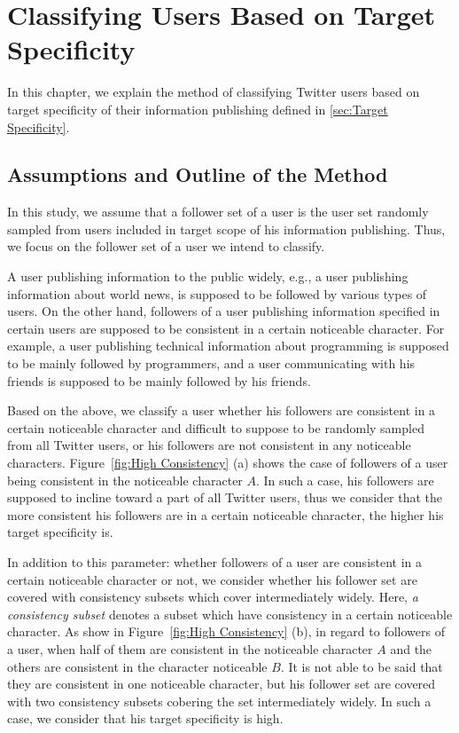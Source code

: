 \section{Classifying Users Based on Target Specificity}
\label{sec:ClassificationMethod1}

In this chapter, we explain the method of classifying Twitter users
based on target specificity of their information publishing defined
in \ref{sec:Target Specificity}.

\subsection{Assumptions and Outline of the Method}
\label{subsec:Assumptions}

In this study, we assume that a follower set of a user is the
user set randomly sampled from users included in target scope of his
information publishing.  Thus, we focus on the follower set of a user we
intend to classify.

A user publishing information to the public widely, e.g., a user
publishing information about world news, is supposed to be followed
by various types of users.  On the other hand, followers of a user
publishing information specified in certain users are supposed to be
consistent in a certain noticeable character.  For example, a user
publishing technical information about programming is supposed to be
mainly followed by programmers, and a user communicating with his
friends is supposed to be mainly followed by his friends.

Based on the above, we classify a user whether his followers are consistent
in a certain noticeable character and difficult to suppose to be
randomly sampled from all Twitter users, or his followers are not
consistent in any noticeable characters.  Figure~\ref{fig:High
Consistency} (a) shows the case of followers of a user being consistent
in the noticeable character $A$.  In such a case, his followers are
supposed to incline toward a part of all Twitter users, thus we consider
that the more consistent his followers are in a certain noticeable
character, the higher his target specificity is.

In addition to this parameter: whether followers of a user are
consistent in a certain noticeable character or not, we consider
whether his follower set are covered with consistency subsets which
cover intermediately widely.  Here, \emph{a consistency subset} denotes
a subset which have consistency in a certain noticeable character.  As
show in Figure~\ref{fig:High Consistency} (b), in regard to followers of
a user, when half of them are consistent in the noticeable character $A$
and the others are consistent in the character noticeable $B$.  It is
not able to
be said that they are consistent in one noticeable character, but
his follower set are covered with two consistency subsets cobering the
set intermediately widely.  In such a case, we consider that his
target specificity is high.


